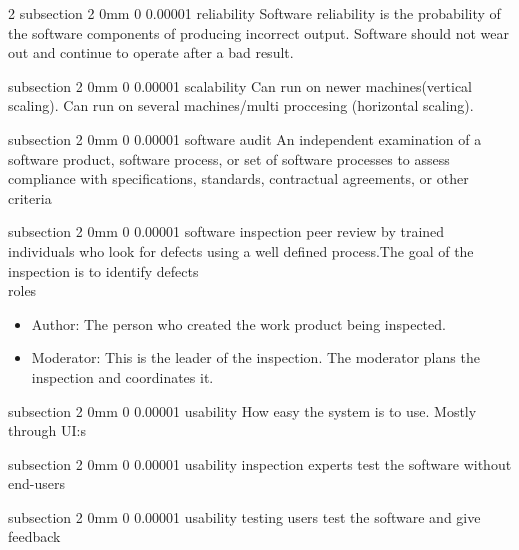 \documentclass[a4paper,11pt]{article}
\makeatletter
\renewcommand{\subsection}{\@startsection
   {subsection}%
   {2}%
   {0mm}%
   {0\baselineskip}%
   {0.00001\baselineskip}%
   {\rmfamily\normalfont\slshape\normalsize}}%
\makeatother
\begin{document}
\begin{multicols}{2}
\subsection{reliability}
Software reliability is the probability of the software components of producing incorrect output. Software should not wear out and continue to operate after a bad result.

\subsection{scalability}
Can run on newer machines(vertical scaling). Can run on several machines/multi proccesing (horizontal scaling).

\subsection{software audit}
An independent examination of a software product, software process, or set of software processes to assess compliance with specifications, standards, contractual agreements, or other criteria

\subsection{software inspection}
peer review by trained individuals who look for defects using a well defined process.The goal of the inspection is to identify defects
\\roles
\vspace{0 mm}
\begin{itemize}
 \setlength\itemsep{0em}
\item Author: The person who created the work product being inspected.
\item Moderator: This is the leader of the inspection. The moderator plans the inspection and coordinates it.
\end{itemize}

\subsection{usability}
How easy the system is to use. Mostly through UI:s

\subsection{usability inspection}
experts test the software without end-users

\subsection{usability testing}
users test the software and give feedback

\end{multicols}
\end{document}
